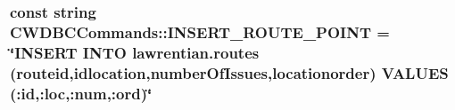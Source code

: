 \subsubsection[{I\+N\+S\+E\+R\+T\+\_\+\+R\+O\+U\+T\+E\+\_\+\+P\+O\+I\+N\+T}]{\setlength{\rightskip}{0pt plus 5cm}const string C\+W\+D\+B\+C\+Commands\+::\+I\+N\+S\+E\+R\+T\+\_\+\+R\+O\+U\+T\+E\+\_\+\+P\+O\+I\+N\+T = \char`\"{}I\+N\+S\+E\+R\+T I\+N\+T\+O lawrentian.\+routes (routeid,idlocation,number\+Of\+Issues,locationorder) V\+A\+L\+U\+E\+S (\+:id,\+:loc,\+:num,\+:ord)\char`\"{}}\label{namespace_c_w_d_b_c_commands_abd88284f4660e14a8b6397613a162bce}
